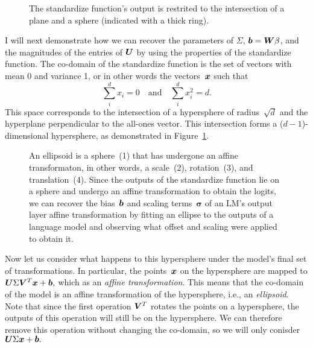 \documentclass{article}
\begin{document}
\begin{figure}
  \centering
  \small
  
  \caption{The standardize function's output is restrited to the intersection of a plane and a sphere (indicated with a thick ring).}
  \label{fig:standardize}
\end{figure}

I will next demonstrate how we can recover the parameters of \(\Sigma\), 
\({\bm{b}}={\bm{W}}\beta\), and the magnitudes of the entries of \({\bm{U}}\)
by using the properties of the standardize function.
The co-domain of the standardize function
is the set of vectors with mean 0 and variance 1,
or in other words the vectors~\({\bm{x}}\) such that 
\[\sum_i^dx_i=0\quad\text{and}\quad \sum_i^dx_i^2=d.\]
This space corresponds to the intersection of a hypersphere of radius~\(\sqrt{d}\)
and the hyperplane perpendicular to the all-ones vector.
This intersection forms a (\(d-1\))-dimensional hypersphere,
as demonstrated in Figure~\ref{fig:standardize}.

\begin{figure}
  \centering
  
  \caption{
    An ellipsoid is a sphere~(1) that has undergone an affine transformaton, in other words, a scale~(2), rotation~(3), and translation~(4).
    Since the outputs of the standardize function lie on a sphere
    and undergo an affine transformation to obtain the logits,
    we can recover the bias~\({\bm{b}}\) and scaling terms~\(\boldsymbol\sigma\)
    of an LM's output layer affine transformation
    by fitting an ellipse to the outputs of a language model 
    and observing what offset and scaling were applied to obtain it.
  }
\end{figure}

Now let us consider what happens to this hypersphere under the model's final set of transformations.
In particular, the points~\({\bm{x}}\) on the hypersphere are mapped to 
\({\bm{U}}\Sigma{\bm{V}}^T{\bm{x}} + {\bm{b}},\)
which as an \emph{affine transformation}.
This means that the co-domain of the model is an affine transformation of the hypersphere, i.e., an \emph{ellipsoid}.
Note that since the first operation \({\bm{V}}^T\) rotates the points on a hypersphere,
the outputs of this operation will still be on the hypersphere.
We can therefore remove this operation without changing the co-domain, 
so we will only conisder \({\bm{U}}\Sigma{\bm{x}} + {\bm{b}}.\)
\end{document}
